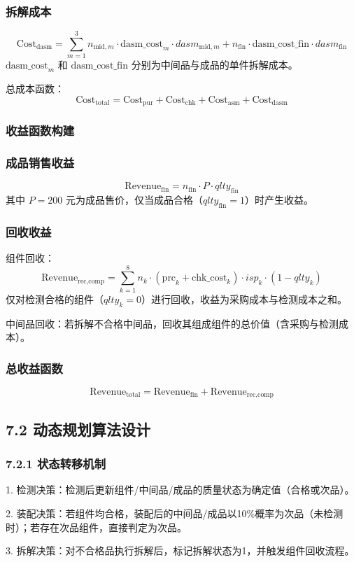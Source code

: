 \documentclass{article}
\begin{document}
	\subsubsection*{拆解成本}  
	\[
	\text{Cost}_{\text{dasm}} = \sum_{m=1}^3 n_{\text{mid},m} \cdot \text{dasm\_cost}_m \cdot dasm_{\text{mid},m} + n_{\text{fin}} \cdot \text{dasm\_cost\_fin} \cdot dasm_{\text{fin}}
	\]  
	\(\text{dasm\_cost}_m\) 和 \(\text{dasm\_cost\_fin}\) 分别为中间品与成品的单件拆解成本。  
	
	总成本函数：  
	\[
	\text{Cost}_{\text{total}} = \text{Cost}_{\text{pur}} + \text{Cost}_{\text{chk}} + \text{Cost}_{\text{asm}} + \text{Cost}_{\text{dasm}}
	\]  
	
	\subsubsection*{收益函数构建}  
	\subsubsection*{成品销售收益}  
	\[
	\text{Revenue}_{\text{fin}} = n_{\text{fin}} \cdot P \cdot qlty_{\text{fin}}
	\]  
	其中 \(P = 200\) 元为成品售价，仅当成品合格（\(qlty_{\text{fin}} = 1\)）时产生收益。  
	
	\subsubsection*{回收收益}  
	组件回收：  
	\[
	\text{Revenue}_{\text{rec,comp}} = \sum_{k=1}^8 n_k \cdot (\text{prc}_k + \text{chk\_cost}_k) \cdot isp_k \cdot (1 - qlty_k)
	\]  
	仅对检测合格的组件（\(qlty_k = 0\)）进行回收，收益为采购成本与检测成本之和。  \par
	中间品回收：若拆解不合格中间品，回收其组成组件的总价值（含采购与检测成本）。  
	
	\subsubsection*{总收益函数} 
	\[
	\text{Revenue}_{\text{total}} = \text{Revenue}_{\text{fin}} + \text{Revenue}_{\text{rec,comp}}
	\]  
	
	\subsection*{7.2 动态规划算法设计}  
	\subsubsection*{7.2.1 状态转移机制}  
	1. 检测决策：检测后更新组件/中间品/成品的质量状态为确定值（合格或次品）。\par  
	2. 装配决策：若组件均合格，装配后的中间品/成品以10\%概率为次品（未检测时）；若存在次品组件，直接判定为次品。\par  
	3. 拆解决策：对不合格品执行拆解后，标记拆解状态为1，并触发组件回收流程。\par  
	
\end{document}
